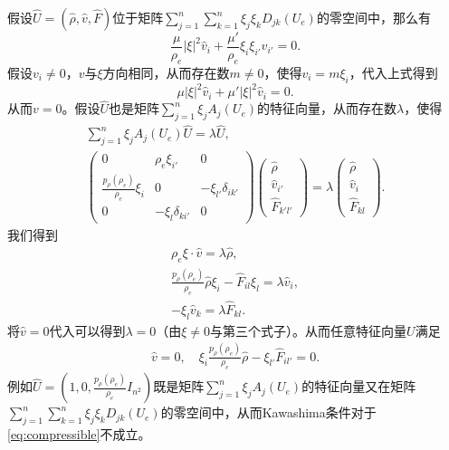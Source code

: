 假设$\hat{U} = (\hat{\rho}, \hat{ v },\hat{F})$位于矩阵$\sum_{j=1}^n \sum_{k=1}^n  \xi_j \xi_k D_{jk}(U_e)$的零空间中，那么有
\begin{equation*}
    \frac{\mu}{\rho_e} |\xi|^2 \hat{v}_i + \frac{\mu'}{\rho_e} \xi_i \xi_{i'} \hat{v}_{i'} = 0.
\end{equation*}
假设$v_{i} \neq 0$，$v$与$\xi$方向相同，从而存在数$m \neq 0$，使得$v_i = m \xi_i$，代入上式得到
\begin{equation*}
    \mu |\xi|^2 \hat{v}_i + \mu' |\xi|^2 \hat{v}_i = 0. 
\end{equation*}
从而$v=0$。假设$\hat{U}$也是矩阵$ \sum_{j=1}^n \xi_j A_j(U_e)$的特征向量，从而存在数$\lambda$，使得
\begin{eqnarray*}
    \sum_{j=1}^n \xi_j A_j(U_e)\hat{U} = \lambda \hat{U}, \\
     \left( \begin{array}{ccc} 0 & \rho_e \xi_{i'} & 0 \\
    \frac{p_\rho(\rho_e)}{\rho_e} \xi_i & 0 & -\xi_{l'} \delta_{ik'} \\
    0 & - \xi_{l}\delta_{ki'}  & 0 \end{array} \right)
    \left(\begin{array}{c}
        \hat{\rho} \\ \hat{ v}_{i'} \\ \hat{F}_{k'l'}
    \end{array} \right) = \lambda
    \left(\begin{array}{c}
        \hat{\rho} \\ \hat{ v }_i \\ \hat{F}_{kl}
    \end{array} \right).
\end{eqnarray*}
我们得到
\begin{eqnarray*}
    \rho_e \xi \cdot \hat{v}  = \lambda \hat{\rho} , \\
    \frac{p_\rho(\rho_e)}{\rho_e} \hat{\rho} \xi_i - \hat{F}_{il} \xi_l = \lambda \hat{v}_i, \\
    -\xi_l \hat{v}_k = \lambda \hat{F}_{kl}.
\end{eqnarray*}
将$\hat{v}=0$代入可以得到$\lambda = 0$（由$\xi \neq 0$与第三个式子）。从而任意特征向量$U$满足
\begin{eqnarray} \label{eq:linear}
    \hat{ v }=0, \quad \xi_i \frac{p_\rho(\rho_e)}{\rho_e} \hat{\rho} - \xi_{l'} \hat{F}_{il'} = 0.
\end{eqnarray}
例如$\hat{U} = (1,0,\frac{p_\rho(\rho_e)}{\rho_e} I_{n^2})$既是矩阵$ \sum_{j=1}^n \xi_j A_j(U_e)$的特征向量又在矩阵$\sum_{j=1}^n \sum_{k=1}^n \xi_j \xi_k D_{jk}(U_e)$的零空间中，从而Kawashima条件对于\eqref{eq:compressible}不成立。

